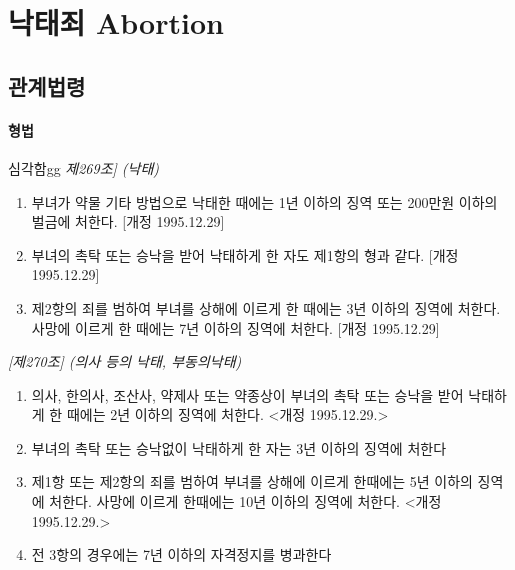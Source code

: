 ﻿\section{낙태죄 Abortion}
\subsection{관계법령}
\paragraph{형법}\par
심각함gg
\emph{제269조] (낙태)}
	\begin{enumerate}[①]\tightlist
	\item 부녀가 약물 기타 방법으로 낙태한 때에는 1년 이하의 징역 또는 200만원 이하의 벌금에 처한다. [개정 1995.12.29]
	\item 부녀의 촉탁 또는 승낙을 받어 낙태하게 한 자도 제1항의 형과 같다. [개정 1995.12.29]
	\item 제2항의 죄를 범하여 부녀를 상해에 이르게 한 때에는 3년 이하의 징역에 처한다. 사망에 이르게 한 때에는 7년 이하의 징역에 처한다. [개정 1995.12.29]
	\end{enumerate}
\emph{[제270조] (의사 등의 낙태, 부동의낙태)}
	\begin{enumerate}[①]\tightlist
	\item 의사, 한의사, 조산사, 약제사 또는 약종상이 부녀의 촉탁 또는 승낙을 받어 낙태하게 한 때에는 2년 이하의 징역에 처한다.  <개정 1995.12.29.>
	\item 부녀의 촉탁 또는 승낙없이 낙태하게 한 자는 3년 이하의 징역에 처한다
	\item 제1항 또는 제2항의 죄를 범하여 부녀를 상해에 이르게 한때에는 5년 이하의 징역에 처한다. 사망에 이르게 한때에는 10년 이하의 징역에 처한다.  <개정 1995.12.29.>
	\item 전 3항의 경우에는 7년 이하의 자격정지를 병과한다
	\end{enumerate}

